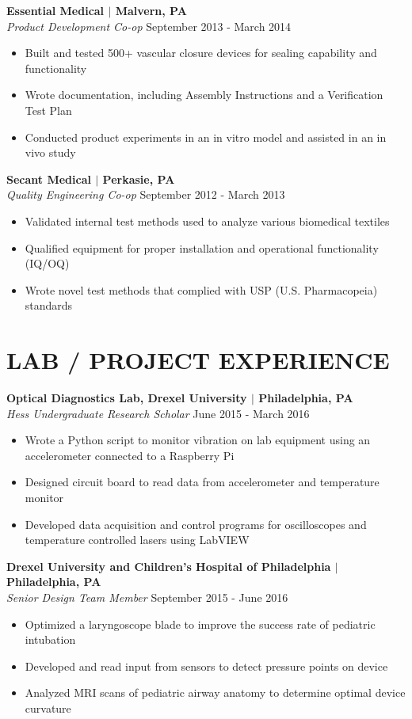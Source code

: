 \documentclass[line,resmargin,11pt]{res}
\begin{document}
\begin{resume}
\textbf{Essential Medical $|$ Malvern, PA} \\
{\sl Product Development Co-op} \hfill September 2013 - March 2014
	\begin{itemize} \itemsep -2pt
		\item  Built and tested 500+ vascular closure devices for sealing capability and functionality
		\item  Wrote documentation, including Assembly Instructions and a Verification Test Plan
		\item  Conducted product experiments in an in vitro model and assisted in an in vivo study
	\end{itemize}

\textbf{Secant Medical $|$ Perkasie, PA} \\
{\sl Quality Engineering Co-op} \hfill September 2012 - March 2013 \\
	\begin{itemize} \itemsep -2pt
		\item  Validated internal test methods used to analyze various biomedical textiles
		\item  Qualified equipment for proper installation and operational functionality (IQ/OQ)
		\item  Wrote novel test methods that complied with USP (U.S. Pharmacopeia) standards
	\end{itemize}

\section{LAB / PROJECT EXPERIENCE}
\textbf{Optical Diagnostics Lab, Drexel University $|$ Philadelphia, PA} \\
{\sl Hess Undergraduate Research Scholar} \hfill June 2015 - March 2016
	\begin{itemize}  \itemsep -2pt %
		\item  Wrote a Python script to monitor vibration on lab equipment using an accelerometer connected to a Raspberry Pi
		\item  Designed circuit board to read data from accelerometer and temperature monitor
		\item  Developed data acquisition and control programs for oscilloscopes and temperature controlled lasers using LabVIEW
	\end{itemize}

\textbf{Drexel University and Children's Hospital of Philadelphia $|$ Philadelphia, PA} \\
{\sl Senior Design Team Member} \hfill September 2015 - June 2016 \\
\begin{itemize} \itemsep -2pt
	\item  Optimized a laryngoscope blade to improve the success rate of pediatric intubation
	\item  Developed and read input from sensors to detect pressure points on device
	\item  Analyzed MRI scans of pediatric airway anatomy to determine optimal device curvature
\end{itemize}


\end{resume}
\end{document}
